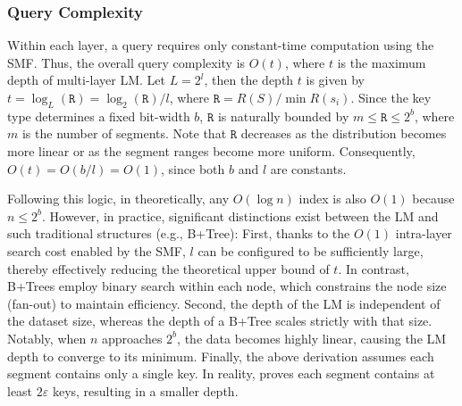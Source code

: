 \subsubsection{Query Complexity}
\label{sec:lm-query-complexity}


Within each layer, a query requires only constant-time computation using the SMF. Thus, the overall query complexity is $O(t)$, where $t$ is the maximum depth of multi-layer LM. Let $\mathit{L} = 2^l$, then the depth $t$ is given by $t = \log_\mathit{L}(\mathtt{R}) = \log_2(\mathtt{R}) / l$, where $\mathtt{R} = R(S)/\min R(s_i)$. Since the key type determines a fixed bit-width $b$, $\mathtt{R}$ is naturally bounded by $m \le \mathtt{R} \le 2^b$, where $m$ is the number of segments. Note that $\mathtt{R}$ decreases as the distribution becomes more linear or as the segment ranges become more uniform. Consequently, $O(t) = O(b/l) = O(1)$, since both $b$ and $l$ are constants.

Following this logic, in theoretically, any $O(\log n)$ index is also $O(1)$ because $n \le 2^b$. However, in practice, significant distinctions exist between the LM and such traditional structures (e.g., B+Tree): First, thanks to the $O(1)$ intra-layer search cost enabled by the SMF, $l$ can be configured to be sufficiently large, thereby effectively reducing the theoretical upper bound of $t$. In contrast, B+Trees employ binary search within each node, which constrains the node size (fan-out) to maintain efficiency. Second, the depth of the LM is independent of the dataset size, whereas the depth of a B+Tree scales strictly with that size. Notably, when $n$ approaches $2^b$, the data becomes highly linear, causing the LM depth to converge to its minimum. Finally, the above derivation assumes each segment contains only a single key. In reality, \cite{pgm20} proves each segment contains at least $2\varepsilon$ keys, resulting in a smaller depth.

